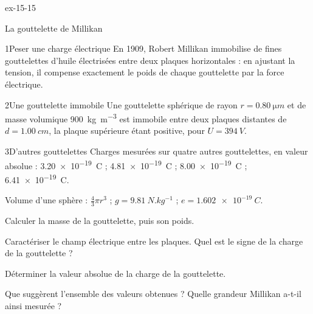 \begin{blocLivre}{ex-15-15}
\begin{exercice}[3]{La gouttelette de Millikan}
\begin{docu}{1}{Peser une charge électrique}
En 1909, Robert Millikan immobilise de fines gouttelettes d'huile électrisées entre deux plaques horizontales : en
ajustant la tension, il compense exactement le poids de chaque gouttelette par la force électrique.
\end{docu}
\begin{docu}{2}{Une gouttelette immobile}
Une gouttelette sphérique de rayon $r=\qty{0,80}{\micro m}$ et de masse volumique \qty{900}{kg.m^{-3}} est immobile entre
deux plaques distantes de $d=\qty{1,00}{cm}$, la plaque supérieure étant positive, pour $U=\qty{394}{V}$.
\end{docu}
\begin{docu}{3}{D'autres gouttelettes}
Charges mesurées sur quatre autres gouttelettes, en valeur absolue : \qty{3,20e-19}{C} ; \qty{4,81e-19}{C} ;
\qty{8,00e-19}{C} ; \qty{6,41e-19}{C}.
\end{docu}
\begin{donnees}
Volume d'une sphère : $\frac43\pi r^3$ ; $g=\qty{9,81}{N.kg^{-1}}$ ; $e=\qty{1,602e-19}{C}$.
\end{donnees}
\begin{questions}
\item Calculer la masse de la gouttelette, puis son poids.
\item Caractériser le champ électrique entre les plaques. Quel est le signe de la charge de la gouttelette ?
\item \initiative Déterminer la valeur absolue de la charge de la gouttelette.
\item Que suggèrent l'ensemble des valeurs obtenues ? Quelle grandeur Millikan a-t-il ainsi mesurée ?
\end{questions}
\end{exercice}
\end{blocLivre}
